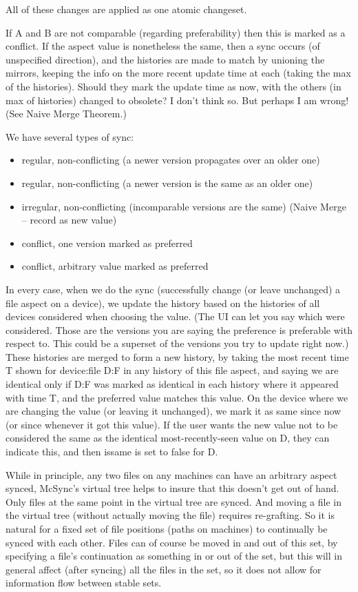\documentclass{book}
\begin{document}
All of these changes are applied as one atomic changeset.

If A and B are not comparable (regarding preferability) then this is marked as a conflict.  If the aspect value is nonetheless the same, then a sync occurs (of unspecified direction), and the histories are made to match by unioning the mirrors, keeping the info on the more recent update time at each (taking the max of the histories).  Should they mark the update time as now, with the others (in max of histories) changed to obsolete?  I don't think so.  But perhaps I am wrong!  (See Naive Merge Theorem.)

We have several types of sync:
\begin{itemize}
\item regular, non-conflicting (a newer version propagates over an older one)
\item regular, non-conflicting (a newer version is the same as an older one)
\item irregular, non-conflicting (incomparable versions are the same) (Naive Merge -- record as new value)
\item conflict, one version marked as preferred
\item conflict, arbitrary value marked as preferred
\end{itemize}
In every case, when we do the sync (successfully change (or leave unchanged) a file aspect on a device), we update the history based on the histories of all devices considered when choosing the value.  (The UI can let you say which were considered.  Those are the versions you are saying the preference is preferable with respect to.  This could be a superset of the versions you try to update right now.)  These histories are merged to form a new history, by taking the most recent time T shown for device:file D:F in any history of this file aspect, and saying we are identical only if D:F was marked as identical in each history where it appeared with time T, and the preferred value matches this value.  On the device where we are changing the value (or leaving it unchanged), we mark it as same since now (or since whenever it got this value).  If the user wants the new value not to be considered the same as the identical most-recently-seen value on D, they can indicate this, and then issame is set to false for D.

While in principle, any two files on any machines can have an arbitrary aspect synced, McSync's virtual tree helps to insure that this doesn't get out of hand.  Only files at the same point in the virtual tree are synced.  And moving a file in the virtual tree (without actually moving the file) requires re-grafting.  So it is natural for a fixed set of file positions (paths on machines) to continually be synced with each other.  Files can of course be moved in and out of this set, by specifying a file's continuation as something in or out of the set, but this will in general affect (after syncing) all the files in the set, so it does not allow for information flow between stable sets.
\end{document}
